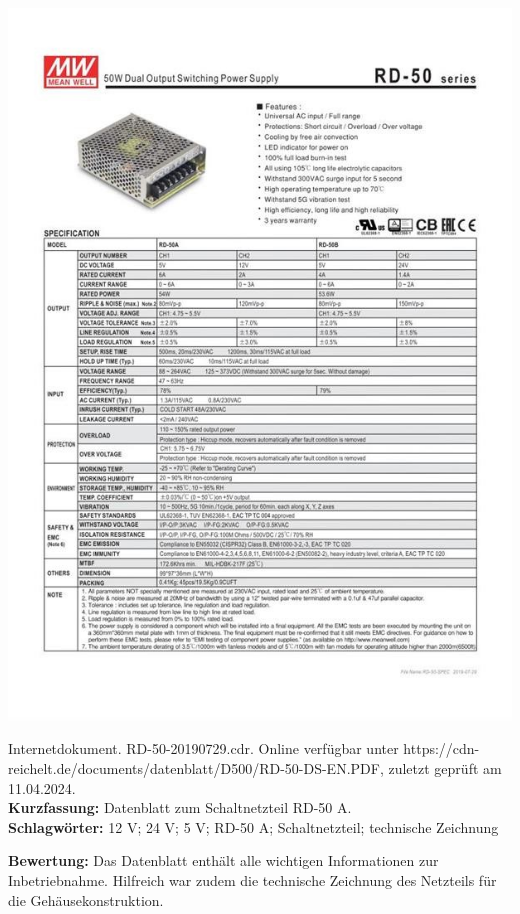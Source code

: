 {
\begin{minipage}{0.38\textwidth}
	\includegraphics[width=\linewidth]{images/Meanwell.jpg}
\end{minipage}
\hfill
\begin{minipage}{0.6\textwidth}
Internetdokument. RD-50-20190729.cdr.
Online verfügbar unter https://cdn-reichelt.de/documents/datenblatt/D500/RD-50-DS-EN.PDF, zuletzt geprüft am 11.04.2024.
\\ \textbf{Kurzfassung:}
Datenblatt zum Schaltnetzteil RD-50 A.
\\ \textbf{Schlagwörter:}
12 V; 24 V; 5 V; RD-50 A; Schaltnetzteil; technische Zeichnung
\end{minipage}
\textbf{Bewertung:}
Das Datenblatt enthält alle wichtigen Informationen zur Inbetriebnahme. Hilfreich war zudem die technische Zeichnung des Netzteils für die Gehäusekonstruktion.
}

